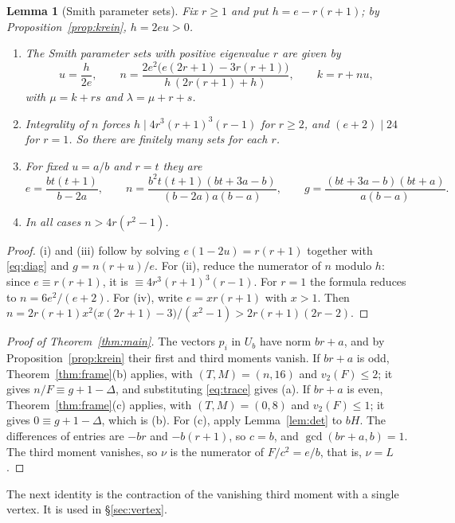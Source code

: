 \documentclass[11pt]{article}
\newtheorem{lemma}[theorem]{Lemma}
\theoremstyle{definition}
\theoremstyle{remark}
\begin{document}
\begin{lemma}[Smith parameter sets]\label{lem:param}
Fix $r\ge1$ and put $h=e-r(r+1)$; by Proposition~\ref{prop:krein},
$h=2eu>0$.
\begin{enumerate}[label=\textup{(\roman*)}]
\item The Smith parameter sets with positive eigenvalue $r$ are given by
\[
 u=\frac h{2e},\qquad
 n=\frac{2e^2\bigl(e(2r+1)-3r(r+1)\bigr)}{h\,(2r(r+1)+h)},\qquad k=r+nu,
\]
with $\mu=k+rs$ and $\lambda=\mu+r+s$.
\item Integrality of $n$ forces $h\mid4r^3(r+1)^3(r-1)$ for $r\ge2$, and
$(e+2)\mid24$ for $r=1$. So there are finitely many sets for each $r$.
\item For fixed $u=a/b$ and $r=t$ they are
\[
 e=\frac{bt(t+1)}{b-2a},\qquad
 n=\frac{b^2t(t+1)(bt+3a-b)}{(b-2a)a(b-a)},\qquad
 g=\frac{(bt+3a-b)(bt+a)}{a(b-a)}.
\]
\item In all cases $n>4r(r^2-1)$.
\end{enumerate}
\end{lemma}

\begin{proof}
(i) and (iii) follow by solving $e(1-2u)=r(r+1)$ together with \eqref{eq:diag}
and $g=n(r+u)/e$. For (ii), reduce the numerator of $n$ modulo $h$: since
$e\equiv r(r+1)$, it is $\equiv4r^3(r+1)^3(r-1)$. For $r=1$ the formula reduces
to $n=6e^2/(e+2)$. For (iv), write $e=xr(r+1)$ with $x>1$. Then
$n=2r(r+1)x^2\bigl(x(2r+1)-3\bigr)/(x^2-1)>2r(r+1)(2r-2)$.
\end{proof}

\begin{proof}[Proof of Theorem~\ref{thm:main}]
The vectors $p_i$ in $U_b$ have norm $br+a$, and by
Proposition~\ref{prop:krein} their first and third moments vanish. If $br+a$
is odd, Theorem~\ref{thm:frame}(b) applies, with $(T,M)=(n,16)$ and
$v_2(F)\le2$; it gives $n/F\equiv g+1-\Delta$, and substituting
\eqref{eq:trace} gives (a). If $br+a$ is even, Theorem~\ref{thm:frame}(c)
applies, with $(T,M)=(0,8)$ and $v_2(F)\le1$; it gives $0\equiv g+1-\Delta$,
which is (b). For (c), apply Lemma~\ref{lem:det} to $bH$. The differences of entries are
$-br$ and $-b(r+1)$, so $c=b$, and $\gcd(br+a,b)=1$. The third moment vanishes,
so $\nu$ is the numerator of $F/c^2=e/b$, that is, $\nu=L$.
\end{proof}

The next identity is the contraction of the vanishing third moment with a
single vertex. It is used in \S\ref{sec:vertex}.
\end{document}
